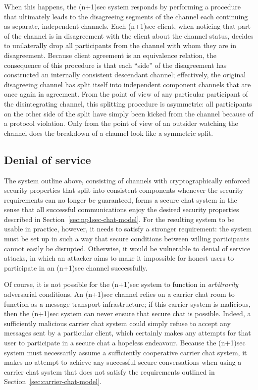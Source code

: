 \documentclass{article}
\begin{document}
When this happens, the (n+1)sec system responds by performing a procedure that ultimately leads to the disagreeing segments of the channel each continuing as separate, independent channels.
Each (n+1)sec client, when noticing that part of the channel is in disagreement with the client about the channel status, decides to unilaterally drop all participants from the channel with whom they are in disagreement.
Because client agreement is an equivalence relation, the consequence of this procedure is that each ``side'' of the disagreement has constructed an internally consistent descendant channel; effectively, the original disagreeing channel has split itself into independent component channels that are once again in agreement.
From the point of view of any particular participant of the disintegrating channel, this splitting procedure is asymmetric: all participants on the other side of the split have simply been kicked from the channel because of a protocol violation.
Only from the point of view of an outsider watching the channel does the breakdown of a channel look like a symmetric split.

\subsection{Denial of service}
The system outline above, consisting of channels with cryptographically enforced security properties that split into consistent components whenever the security requirements can no longer be guaranteed, forms a secure chat system in the sense that all successful communications enjoy the desired security properties described in Section~\ref{sec:np1sec-chat-model}.
For the resulting system to be usable in practice, however, it needs to satisfy a stronger requirement: the system must be set up in such a way that secure conditions between willing participants cannot easily be disrupted.
Otherwise, it would be vulnerable to denial of service attacks, in which an attacker aims to make it impossible for honest users to participate in an (n+1)sec channel successfully.

Of course, it is not possible for the (n+1)sec system to function in \emph{arbitrarily} adversarial conditions.
An (n+1)sec channel relies on a carrier chat room to function as a message transport infrastructure; if this carrier system is malicious, then the (n+1)sec system can never ensure that secure chat is possible.
Indeed, a sufficiently malicious carrier chat system could simply refuse to accept any messages sent by a particular client, which certainly makes any attempts for that user to participate in a secure chat a hopeless endeavour.
Because the (n+1)sec system must necessarily assume a sufficiently cooperative carrier chat system, it makes no attempt to achieve any successful secure conversations when using a carrier chat system that does not satisfy the requirements outlined in Section~\ref{sec:carrier-chat-model}.
\end{document}
